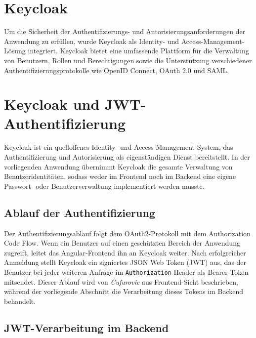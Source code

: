 \section{Keycloak}

Um die Sicherheit der Authentifizierungs- und Autorisierungsanforderungen der Anwendung zu erfüllen, 
wurde Keycloak als Identity- und Access-Management-Lösung integriert. 
Keycloak bietet eine umfassende Plattform für die Verwaltung von Benutzern, 
Rollen und Berechtigungen sowie die Unterstützung verschiedener Authentifizierungsprotokolle 
wie OpenID Connect, OAuth 2.0 und SAML.




\section{Keycloak und JWT-Authentifizierung}

Keycloak ist ein quelloffenes Identity- und Access-Management-System, das
Authentifizierung und Autorisierung als eigenständigen Dienst bereitstellt.
In der vorliegenden Anwendung übernimmt Keycloak die gesamte Verwaltung von
Benutzeridentitäten, sodass weder im Frontend noch im Backend eine eigene
Passwort- oder Benutzerverwaltung implementiert werden musste.

\subsection{Ablauf der Authentifizierung}

Der Authentifizierungsablauf folgt dem OAuth2-Protokoll mit dem Authorization
Code Flow. Wenn ein Benutzer auf einen geschützten Bereich der Anwendung
zugreift, leitet das Angular-Frontend ihn an Keycloak weiter. Nach erfolgreicher
Anmeldung stellt Keycloak ein signiertes JSON Web Token (JWT) aus, das der
Benutzer bei jeder weiteren Anfrage im \texttt{Authorization}-Header als
Bearer-Token mitsendet. Dieser Ablauf wird von \textit{Cufurovic} aus
Frontend-Sicht beschrieben, während der vorliegende Abschnitt die Verarbeitung
dieses Tokens im Backend behandelt.

\subsection{JWT-Verarbeitung im Backend}

